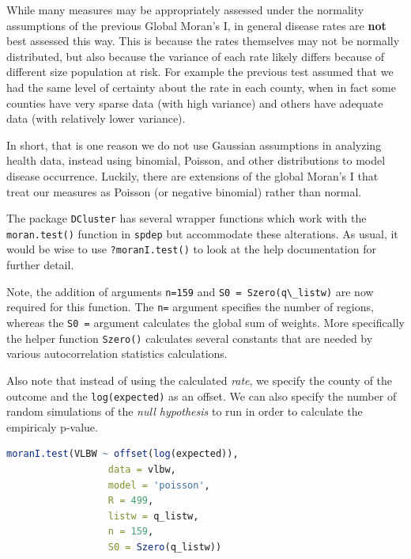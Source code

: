 \documentclass[
]{book}
\newcommand{\passthrough}[1]{#1}
\begin{document}
While many measures may be appropriately assessed under the normality assumptions of the previous Global Moran's I, in general disease rates are \textbf{not} best assessed this way. This is because the rates themselves may not be normally distributed, but also because the variance of each rate likely differs because of different size population at risk. For example the previous test assumed that we had the same level of certainty about the rate in each county, when in fact some counties have very sparse data (with high variance) and others have adequate data (with relatively lower variance).

In short, that is one reason we do not use Gaussian assumptions in analyzing health data, instead using binomial, Poisson, and other distributions to model disease occurrence. Luckily, there are extensions of the global Moran's I that treat our measures as Poisson (or negative binomial) rather than normal.

The package \passthrough{\lstinline!DCluster!} has several wrapper functions which work with the \passthrough{\lstinline!moran.test()!} function in \passthrough{\lstinline!spdep!} but accommodate these alterations. As usual, it would be wise to use \passthrough{\lstinline!?moranI.test()!} to look at the help documentation for further detail.

Note, the addition of arguments \passthrough{\lstinline!n=159!} and \passthrough{\lstinline!S0 = Szero(q\_listw)!} are now required for this function. The \passthrough{\lstinline!n=!} argument specifies the number of regions, whereas the \passthrough{\lstinline!S0 =!} argument calculates the global sum of weights. More specifically the helper function \passthrough{\lstinline!Szero()!} calculates several constants that are needed by various autocorrelation statistics calculations.

Also note that instead of using the calculated \emph{rate}, we specify the county of the outcome and the \passthrough{\lstinline!log(expected)!} as an offset. We can also specify the number of random simulations of the \emph{null hypothesis} to run in order to calculate the empiricaly p-value.

\begin{lstlisting}[language=R]
moranI.test(VLBW ~ offset(log(expected)), 
                  data = vlbw,
                  model = 'poisson',
                  R = 499,
                  listw = q_listw,
                  n = 159,
                  S0 = Szero(q_listw))
\end{lstlisting}
\end{document}
